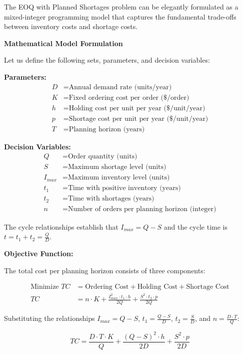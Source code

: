\documentclass{article}
\begin{document}
The EOQ with Planned Shortages problem can be elegantly formulated as a mixed-integer programming model that captures the fundamental trade-offs between inventory costs and shortage costs.

\textbf{Mathematical Model Formulation}

Let us define the following sets, parameters, and decision variables:

\textbf{Parameters:}
\begin{align}
D &= \text{Annual demand rate (units/year)} \\
K &= \text{Fixed ordering cost per order (\$/order)} \\
h &= \text{Holding cost per unit per year (\$/unit/year)} \\
p &= \text{Shortage cost per unit per year (\$/unit/year)} \\
T &= \text{Planning horizon (years)}
\end{align}

\textbf{Decision Variables:}
\begin{align}
Q &= \text{Order quantity (units)} \\
S &= \text{Maximum shortage level (units)} \\
I_{max} &= \text{Maximum inventory level (units)} \\
t_1 &= \text{Time with positive inventory (years)} \\
t_2 &= \text{Time with shortages (years)} \\
n &= \text{Number of orders per planning horizon (integer)}
\end{align}

The cycle relationships establish that $I_{max} = Q - S$ and the cycle time is $t = t_1 + t_2 = \frac{Q}{D}$.

\textbf{Objective Function:}

The total cost per planning horizon consists of three components:

\begin{align}
\text{Minimize } TC &= \text{Ordering Cost} + \text{Holding Cost} + \text{Shortage Cost} \\
TC &= n \cdot K + \frac{I_{max}^2 \cdot t_1 \cdot h}{2Q} + \frac{S^2 \cdot t_2 \cdot p}{2Q}
\end{align}

Substituting the relationships $I_{max} = Q - S$, $t_1 = \frac{Q-S}{D}$, $t_2 = \frac{S}{D}$, and $n = \frac{D \cdot T}{Q}$:

\begin{equation}
TC = \frac{D \cdot T \cdot K}{Q} + \frac{(Q-S)^2 \cdot h}{2D} + \frac{S^2 \cdot p}{2D}
\end{equation}
\end{document}
